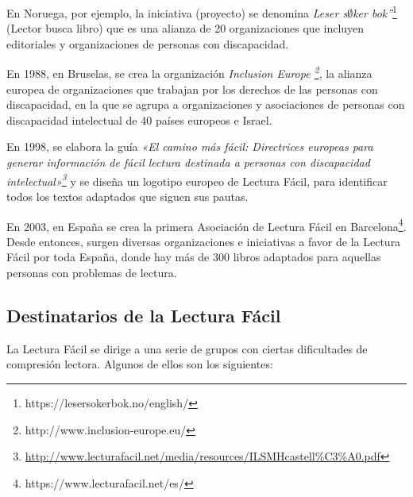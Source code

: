  \setlength{\parskip}{10pt}
 
En Noruega, por ejemplo, la iniciativa (proyecto) se denomina \textit{Leser s$\emptyset$ker bok”}\footnote{https://lesersokerbok.no/english/} (Lector busca libro) que es una alianza de 20 organizaciones que incluyen editoriales y organizaciones de personas con discapacidad.

 \setlength{\parskip}{10pt}
 
En 1988, en Bruselas, se crea la organización \textit{Inclusion Europe \footnote{http://www.inclusion-europe.eu/}}, la alianza europea de organizaciones que trabajan por los derechos de las personas con discapacidad, en la que se agrupa a organizaciones y asociaciones de personas con discapacidad intelectual de 40 países europeos e Israel.

 \setlength{\parskip}{10pt}

En 1998, se elabora la guía \textit{«El camino más fácil: Directrices europeas para generar información de fácil lectura destinada a personas con discapacidad intelectual»\footnote{\href{http://www.lecturafacil.net/media/resources/ILSMHcastell\%C3\%A0.pdf}{http://www.lecturafacil.net/media/resources/ILSMHcastell\%C3\%A0.pdf}}} y se diseña un logotipo europeo de Lectura Fácil, para identificar todos los textos adaptados que siguen sus pautas.

 \setlength{\parskip}{10pt}
 
En 2003, en España se crea la primera Asociación de Lectura Fácil en Barcelona\footnote{https://www.lecturafacil.net/es/}. Desde entonces, surgen diversas organizaciones e iniciativas a favor de la Lectura Fácil por toda España, donde hay más de 300 libros adaptados para aquellas personas con problemas de lectura.


\subsection{Destinatarios de la Lectura Fácil} \label{subsec:gruposLectores}
La Lectura Fácil se dirige a una serie de grupos con ciertas dificultades de compresión lectora. Algunos de ellos son los siguientes: 
 

